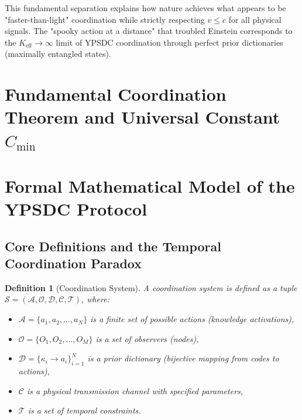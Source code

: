 \documentclass[11pt,a4paper]{article}
\newtheorem{definition}{Definition}
\begin{document}
	This fundamental separation explains how nature achieves what appears to be "faster-than-light" coordination while strictly respecting $v \leq c$ for all physical signals. The "spooky action at a distance" that troubled Einstein corresponds to the $K_{\mathrm{eff}} \to \infty$ limit of YPSDC coordination through perfect prior dictionaries (maximally entangled states).
	
\section{Fundamental Coordination Theorem and Universal Constant \texorpdfstring{$C_{\min}$}{C\_min}}

\section{Formal Mathematical Model of the YPSDC Protocol}
\label{sec:formal-model}

\subsection{Core Definitions and the Temporal Coordination Paradox}

\begin{definition}[Coordination System]
	A coordination system is defined as a tuple $\mathcal{S} = (\mathcal{A}, \mathcal{O}, \mathcal{D}, \mathcal{C}, \mathcal{T})$, where:
	\begin{itemize}
		\item $\mathcal{A} = \{a_1, a_2, \dots, a_N\}$ is a finite set of possible actions (knowledge activations),
		\item $\mathcal{O} = \{O_1, O_2, \dots, O_M\}$ is a set of observers (nodes),
		\item $\mathcal{D} = \{\kappa_i \to a_i\}_{i=1}^N$ is a prior dictionary (bijective mapping from codes to actions),
		\item $\mathcal{C}$ is a physical transmission channel with specified parameters,
		\item $\mathcal{T}$ is a set of temporal constraints.
	\end{itemize}
\end{definition}
\end{document}
